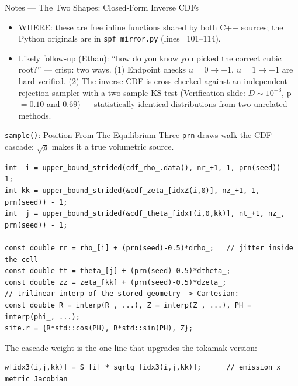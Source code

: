 \documentclass[11pt,aspectratio=169]{beamer}
\begin{document}
\begin{frame}[allowframebreaks]{Notes --- The Two Shapes: Closed-Form Inverse CDFs}
{\begin{itemize}
      sequence. Combined with the bit-exact PCG RNG mirror (\texttt{spf\_mirror.Rng} ports OpenMC's
      PCG-RXS-M-XS \texttt{prn}), a C++-vs-Python parity test is a transcription proof
      (QA\_RESEARCH Q10). The independent cross-check that these roots are \emph{right} (not just
      matching) is the inverse-CDF-vs-rejection two-sample KS test on the Verification slide.
\item WHERE: these are free inline functions shared by both C++ sources; the Python originals are in
      \texttt{spf\_mirror.py} (lines ~101--114).
\item Likely follow-up (Ethan): ``how do you know you picked the correct cubic root?'' --- crisp:
      two ways. (1) Endpoint checks $u=0\to-1$, $u=1\to+1$ are hard-verified. (2) The inverse-CDF is
      cross-checked against an independent rejection sampler with a two-sample KS test (Verification
      slide: $D\sim10^{-3}$, p $=0.10$ and $0.69$) --- statistically identical distributions from
      two unrelated methods.
\end{itemize}
}
\end{frame}

\begin{frame}[fragile]{\texttt{sample()}: Position From The Equilibrium}
Three \texttt{prn} draws walk the CDF cascade; $\sqrt{g}$ makes it a true volumetric source.
\begin{verbatim}
int  i = upper_bound_strided(cdf_rho_.data(), nr_+1, 1, prn(seed)) - 1;
int kk = upper_bound_strided(&cdf_zeta_[idxZ(i,0)], nz_+1, 1, prn(seed)) - 1;
int  j = upper_bound_strided(&cdf_theta_[idxT(i,0,kk)], nt_+1, nz_, prn(seed)) - 1;

const double rr = rho_[i] + (prn(seed)-0.5)*drho_;   // jitter inside the cell
const double tt = theta_[j] + (prn(seed)-0.5)*dtheta_;
const double zz = zeta_[kk] + (prn(seed)-0.5)*dzeta_;
// trilinear interp of the stored geometry -> Cartesian:
const double R = interp(R_, ...), Z = interp(Z_, ...), PH = interp(phi_, ...);
site.r = {R*std::cos(PH), R*std::sin(PH), Z};
\end{verbatim}
The cascade weight is the one line that upgrades the tokamak version:
\begin{verbatim}
w[idx3(i,j,kk)] = S_[i] * sqrtg_[idx3(i,j,kk)];      // emission x metric Jacobian
\end{verbatim}
\end{frame}
\end{document}
